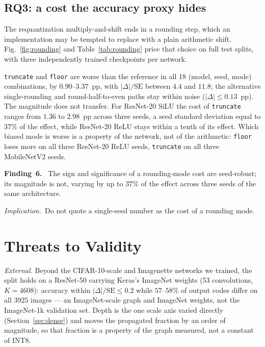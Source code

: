 \documentclass[journal]{IEEEtran}
\newcommand{\finding}[1]{\smallskip\noindent\textbf{Finding~#1.}~}
\newcommand{\implication}{\emph{Implication.}~}
\begin{document}
\begin{table}[!t]
\caption{Rounding-mode cost against the reference implementation, mean $\pm$ standard deviation over three
seeds (pp).}
\label{tab:rounding}
\centering
\footnotesize

\end{table}

\subsection{RQ3: a cost the accuracy proxy hides}
The requantization multiply-and-shift ends in a rounding step, which an implementation may be tempted to
replace with a plain arithmetic shift. Fig.~\ref{fig:rounding} and Table~\ref{tab:rounding} price that choice
on full test splits, with three independently trained checkpoints per network.

\texttt{truncate} and \texttt{floor} are worse than the reference in all 18 (model, seed, mode) combinations,
by $0.90$--$3.37$~pp, with $|\Delta|/\mathrm{SE}$ between $4.4$ and $11.8$; the alternative single-rounding
and round-half-to-even paths stay within noise ($|\Delta| \leq 0.13$~pp). The magnitude does not transfer. For
ResNet-20 SiLU the cost of \texttt{truncate} ranges from $1.36$ to $2.98$~pp across three seeds, a seed
standard deviation equal to $37\%$ of the effect, while ResNet-20 ReLU stays within a tenth of its effect.
Which biased mode is worse is a property of the network, not of the arithmetic: \texttt{floor} loses more on
all three ResNet-20 ReLU seeds, \texttt{truncate} on all three MobileNetV2 seeds.

\finding{6} The sign and significance of a rounding-mode cost are seed-robust; its magnitude is not, varying
by up to $37\%$ of the effect across three seeds of the same architecture.

\implication Do not quote a single-seed number as the cost of a rounding mode.

\section{Threats to Validity}
\emph{External.} Beyond the CIFAR-10-scale and Imagenette networks we trained, the split holds on a ResNet-50
carrying Keras's ImageNet weights (53 convolutions, $K = 4608$): accuracy within $|\Delta|/\mathrm{SE} \le 0.2$
while $57$--$58\%$ of output codes differ on all $3925$ images --- an ImageNet-scale graph and ImageNet weights,
not the ImageNet-1k validation set. Depth is the one scale axis varied directly (Section~\ref{sec:dense}) and
moves the propagated fraction by an order of magnitude, so that fraction is a property of the graph measured,
not a constant of INT8.
\end{document}
